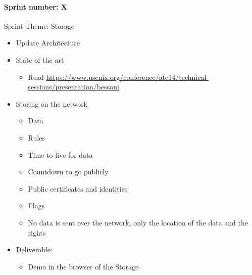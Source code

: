 \paragraph{Sprint number: X}
Sprint Theme: Storage
\begin{itemize}
\item Update Architecture
\item State of the art
\begin{itemize}
    \item Read \url{https://www.usenix.org/conference/atc14/technical-sessions/presentation/bessani}
\end{itemize}
\item Storing on the network
\begin{itemize}
    \item Data
    \item Rules
    \item Time to live for data
    \item Countdown to go publicly
    \item Public certificates and identities
    \item Flags
    \item No data is sent over the network, only the location of the data and the rights
\end{itemize}
\item Deliverable:
\begin{itemize}
    \item Demo in the browser of the Storage
\end{itemize}
\end{itemize}


